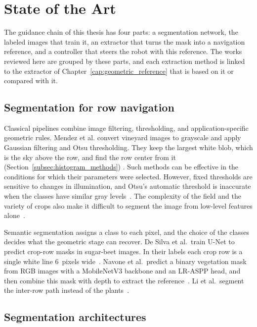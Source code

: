 \chapter{State of the Art}
\label{cap:stato_arte}

The guidance chain of this thesis has four parts: a segmentation network,
the labeled images that train it, an extractor that turns the mask into a
navigation reference, and a controller that steers the robot with this
reference. The works reviewed here are grouped by these parts, and each
extraction method is linked to the extractor of
Chapter~\ref{cap:geometric_reference} that is based on it or compared
with it.

\section{Segmentation for row navigation}
\label{sec:learning_based_segmentation}

Classical pipelines combine image filtering, thresholding, and
application-specific geometric rules. Mendez et al. convert vineyard
images to grayscale and apply Gaussian filtering and Otsu thresholding.
They keep the largest white blob, which is the sky above the row, and
find the row center from it (Section~\ref{subsec:histogram_methods})
\cite{mendez2023vineyards}. Such methods can be
effective in the conditions for which their parameters were selected.
However, fixed thresholds are sensitive to changes in illumination, and
Otsu's automatic threshold is inaccurate when the classes have similar gray
levels~\cite{bai2023vision}. The
complexity of the field and the variety of crops also make it difficult
to segment the image from low-level features
alone~\cite{bai2023vision}.

Semantic segmentation assigns a class to each pixel, and the choice of
the classes decides what the geometric stage can recover. De Silva et
al.\ train U-Net to predict crop-row masks in sugar-beet images. In
their labels each crop row is a single white line 6~pixels
wide~\cite{desilva2024rowdetection}.
Navone et al.\ predict a binary vegetation mask from RGB images with a
MobileNetV3 backbone and an LR-ASPP head, and then combine this mask with
depth to extract the reference~\cite{navone2025gpsfree}.
Li et al.\ segment the inter-row path instead of the
plants~\cite{li2022multiroi}.

\section{Segmentation architectures}
\label{sec:segmentation_architectures}

